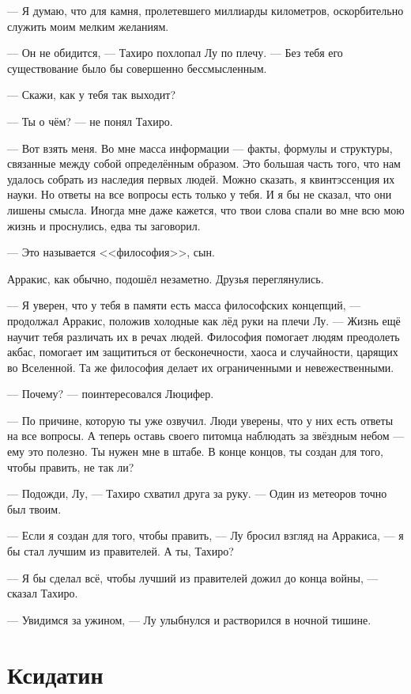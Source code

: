 --- Я думаю, что для камня, пролетевшего миллиарды километров, оскорбительно служить моим мелким желаниям.

--- Он не обидится, --- Тахиро похлопал Лу по плечу.
--- Без тебя его существование было бы совершенно бессмысленным.

--- Скажи, как у тебя так выходит?

--- Ты о чём? --- не понял Тахиро.

--- Вот взять меня.
Во мне масса информации --- факты, формулы и структуры, связанные между собой определённым образом.
Это большая часть того, что нам удалось собрать из наследия первых людей.
Можно сказать, я квинтэссенция их науки.
Но ответы на все вопросы есть только у тебя.
И я бы не сказал, что они лишены смысла.
Иногда мне даже кажется, что твои слова спали во мне всю мою жизнь и проснулись, едва ты заговорил.

--- Это называется <<философия>>, сын.

Арракис, как обычно, подошёл незаметно.
Друзья переглянулись.

--- Я уверен, что у тебя в памяти есть масса философских концепций, --- продолжал Арракис, положив холодные как лёд руки на плечи Лу.
--- Жизнь ещё научит тебя различать их в речах людей.
Философия помогает людям преодолеть акбас, помогает им защититься от бесконечности, хаоса и случайности, царящих во Вселенной.
Та же философия делает их ограниченными и невежественными.

--- Почему? --- поинтересовался Люцифер.

--- По причине, которую ты уже озвучил.
Люди уверены, что у них есть ответы на все вопросы.
А теперь оставь своего питомца наблюдать за звёздным небом --- ему это полезно.
Ты нужен мне в штабе.
В конце концов, ты создан для того, чтобы править, не так ли?

--- Подожди, Лу, --- Тахиро схватил друга за руку.
--- Один из метеоров точно был твоим.

--- Если я создан для того, чтобы править, --- Лу бросил взгляд на Арракиса, --- я бы стал лучшим из правителей.
А ты, Тахиро?

--- Я бы сделал всё, чтобы лучший из правителей дожил до конца войны, --- сказал Тахиро.

--- Увидимся за ужином, --- Лу улыбнулся и растворился в ночной тишине.

\section{Ксидатин}

